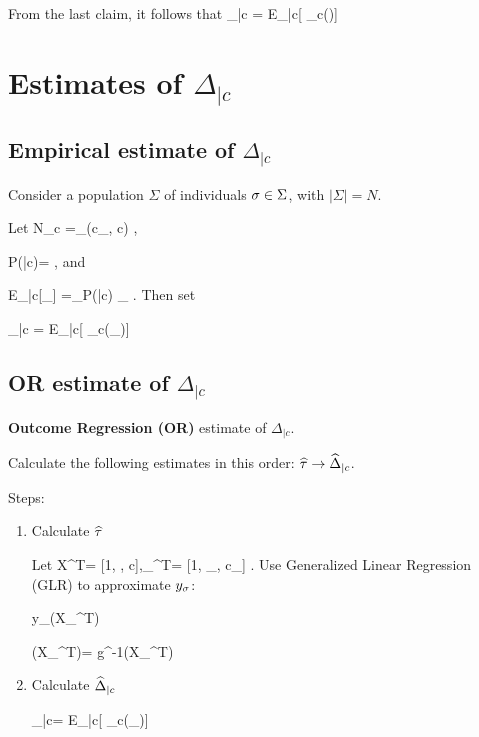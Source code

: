 From the last claim, it follows that
\beq
\Delta_{|c} = 
{E_{\ul{\tilx}|c}[
\lam_c(\tilx)]}
\eeq


\section{Estimates of $\Delta_{|c}$}

\subsection{Empirical estimate of $\Delta_{|c}$ }
Consider a population $\Sigma$
of individuals $\sigma\in \Sigma$,
with $|\Sigma|=N$.

Let
\beq
N_c =\sum_\s \delta(c_\s, c)
\;,
\eeq

\beq
P(\s|c)= 
\;,
\eeq
and

\beq
E_{\s|c}[\xi_\s] =\sum_\s P(\s|c) \xi_\s
\;.
\eeq
Then set

\beq
\HAT{\Delta}_{|c} = 
{E_{\s|c}[
\lam_c(\tilx_\s)]}
\eeq

\subsection{OR estimate of $\Delta_{|c}$}

{\bf Outcome Regression (OR)} estimate
of $\Delta_{|c}$.

Calculate the
following estimates in this order:
$\widehat{\tau}
\rightarrow\widehat{\Delta}_{|c}$.

Steps:
\begin{enumerate}
\item Calculate $\widehat{\tau}$

Let
\beq
{X}^T= [1, \tilx, c],_\s^T= [1, \tilx_\s, c_\s]
\;.
\eeq
Use Generalized 
Linear Regression (GLR)
to approximate $y_\sigma$:

\beq
y_\s \approx {}(X_\s^T\HAT{\tau})
\eeq

\beq
{}(X_\s^T\HAT{\tau})= g^{-1}(X_\s^T\HAT{\tau})
\eeq

\item Calculate $\widehat{\Delta}_{|c}$

\beq
\HAT{\Delta}_{|c}=
{E_{\s|c}[
\lam_c(\tilx_\s)]}
\label{eq-or-est}
\eeq

\end{enumerate}



